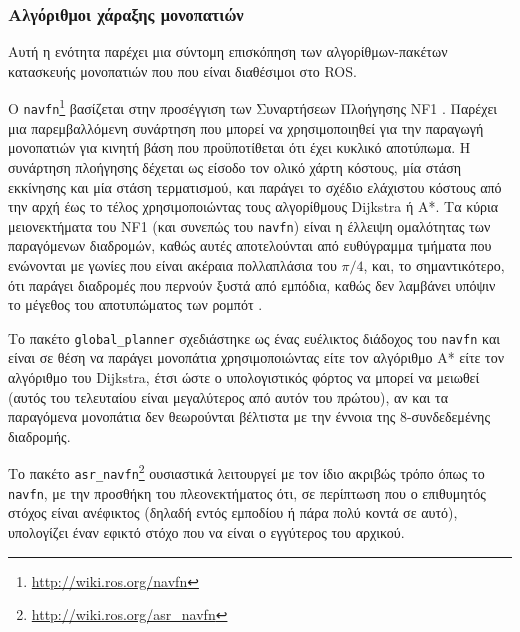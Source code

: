 \subsubsection{Αλγόριθμοι χάραξης μονοπατιών}
\label{subsubsection:02_01_02:03_01}

Αυτή η ενότητα παρέχει μια σύντομη επισκόπηση των αλγορίθμων-πακέτων κατασκευής
μονοπατιών που που είναι διαθέσιμοι στο ROS.


O \texttt{navfn}\footnote{\url{http://wiki.ros.org/navfn}} βασίζεται στην
προσέγγιση των Συναρτήσεων Πλοήγησης NF1 \cite{Latombe1991}. Παρέχει μια
παρεμβαλλόμενη συνάρτηση που μπορεί να χρησιμοποιηθεί για την παραγωγή
μονοπατιών για κινητή βάση που προϋποτίθεται ότι έχει κυκλικό αποτύπωμα. Η
συνάρτηση πλοήγησης δέχεται ως είσοδο τον ολικό χάρτη κόστους, μία στάση
εκκίνησης και μία στάση τερματισμού, και παράγει το σχέδιο ελάχιστου κόστους
από την αρχή έως το τέλος χρησιμοποιώντας τους αλγορίθμους Dijkstra ή A*. Τα
κύρια μειονεκτήματα του NF1 (και συνεπώς του \texttt{navfn}) είναι η έλλειψη
ομαλότητας των παραγόμενων διαδρομών, καθώς αυτές αποτελούνται από ευθύγραμμα
τμήματα που ενώνονται με γωνίες που είναι ακέραια πολλαπλάσια του $\pi/4$, και,
το σημαντικότερο, ότι παράγει διαδρομές που περνούν ξυστά από εμπόδια, καθώς
δεν λαμβάνει υπόψιν το μέγεθος του αποτυπώματος των ρομπότ \cite{Philippsen2004}.

Το πακέτο \texttt{global\_planner} σχεδιάστηκε ως ένας ευέλικτος διάδοχος του
\texttt{navfn} και είναι σε θέση να παράγει μονοπάτια χρησιμοποιώντας είτε τον
αλγόριθμο A* είτε τον αλγόριθμο του Dijkstra, έτσι ώστε ο υπολογιστικός φόρτος
να μπορεί να μειωθεί (αυτός του τελευταίου είναι μεγαλύτερος από αυτόν του
πρώτου), αν και τα παραγόμενα μονοπάτια δεν θεωρούνται βέλτιστα με την έννοια
της 8-συνδεδεμένης διαδρομής.

Το πακέτο \texttt{asr\_navfn}\footnote{\url{http://wiki.ros.org/asr\_navfn}}
ουσιαστικά λειτουργεί με τον ίδιο ακριβώς τρόπο όπως το \texttt{navfn}, με την
προσθήκη του πλεονεκτήματος ότι, σε περίπτωση που ο επιθυμητός στόχος είναι
ανέφικτος (δηλαδή εντός εμποδίου ή πάρα πολύ κοντά σε αυτό), υπολογίζει έναν
εφικτό στόχο που να είναι ο εγγύτερος του αρχικού.


